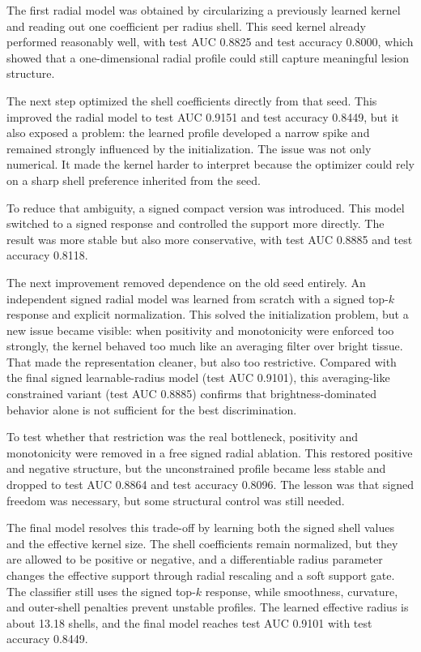 \documentclass{cernatsnote}
\begin{document}
The first radial model was obtained by circularizing a previously learned kernel and reading out one coefficient per radius shell. This seed kernel already performed reasonably well, with test AUC 0.8825 and test accuracy 0.8000, which showed that a one-dimensional radial profile could still capture meaningful lesion structure.

The next step optimized the shell coefficients directly from that seed. This improved the radial model to test AUC 0.9151 and test accuracy 0.8449, but it also exposed a problem: the learned profile developed a narrow spike and remained strongly influenced by the initialization. The issue was not only numerical. It made the kernel harder to interpret because the optimizer could rely on a sharp shell preference inherited from the seed.

To reduce that ambiguity, a signed compact version was introduced. This model switched to a signed response and controlled the support more directly. The result was more stable but also more conservative, with test AUC 0.8885 and test accuracy 0.8118.

The next improvement removed dependence on the old seed entirely. An independent signed radial model was learned from scratch with a signed top-$k$ response and explicit normalization. This solved the initialization problem, but a new issue became visible: when positivity and monotonicity were enforced too strongly, the kernel behaved too much like an averaging filter over bright tissue. That made the representation cleaner, but also too restrictive.
Compared with the final signed learnable-radius model (test AUC 0.9101), this averaging-like constrained variant (test AUC 0.8885) confirms that brightness-dominated behavior alone is not sufficient for the best discrimination.

To test whether that restriction was the real bottleneck, positivity and monotonicity were removed in a free signed radial ablation. This restored positive and negative structure, but the unconstrained profile became less stable and dropped to test AUC 0.8864 and test accuracy 0.8096. The lesson was that signed freedom was necessary, but some structural control was still needed.

The final model resolves this trade-off by learning both the signed shell values and the effective kernel size. The shell coefficients remain normalized, but they are allowed to be positive or negative, and a differentiable radius parameter changes the effective support through radial rescaling and a soft support gate. The classifier still uses the signed top-$k$ response, while smoothness, curvature, and outer-shell penalties prevent unstable profiles. The learned effective radius is about 13.18 shells, and the final model reaches test AUC 0.9101 with test accuracy 0.8449.
\end{document}
